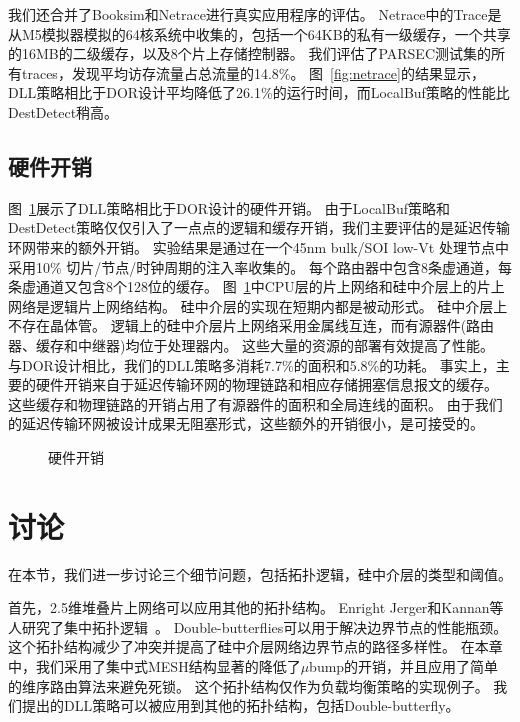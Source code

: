 我们还合并了Booksim和Netrace进行真实应用程序的评估。
Netrace中的Trace是从M5模拟器模拟的64核系统中收集的，包括一个64KB的私有一级缓存，一个共享的16MB的二级缓存，以及8个片上存储控制器。
我们评估了PARSEC测试集的所有traces，发现平均访存流量占总流量的14.8\%。
图~\ref{fig:netrace}的结果显示，DLL策略相比于DOR设计平均降低了26.1\%的运行时间，而LocalBuf策略的性能比DestDetect稍高。

\subsection{硬件开销}

图~\ref{fig:hardware}展示了DLL策略相比于DOR设计的硬件开销。
由于LocalBuf策略和DestDetect策略仅仅引入了一点点的逻辑和缓存开销，我们主要评估的是延迟传输环网带来的额外开销。
实验结果是通过在一个45nm bulk/SOI low-Vt 处理节点中采用10\% 切片/节点/时钟周期的注入率收集的。
每个路由器中包含8条虚通道，每条虚通道又包含8个128位的缓存。
图~\ref{fig:hardware}中CPU层的片上网络和硅中介层上的片上网络是逻辑片上网络结构。
硅中介层的实现在短期内都是被动形式。
硅中介层上不存在晶体管。
逻辑上的硅中介层片上网络采用金属线互连，而有源器件(路由器、缓存和中继器)均位于处理器内。
这些大量的资源的部署有效提高了性能。
与DOR设计相比，我们的DLL策略多消耗7.7\%的面积和5.8\%的功耗。
事实上，主要的硬件开销来自于延迟传输环网的物理链路和相应存储拥塞信息报文的缓存。
这些缓存和物理链路的开销占用了有源器件的面积和全局连线的面积。
由于我们的延迟传输环网被设计成果无阻塞形式，这些额外的开销很小，是可接受的。

\begin{figure}[htb]
\centering
{} 
\caption{硬件开销}
\label{fig:hardware}
\end{figure}


\section{讨论}
\label{sec:dlldiscussion}

在本节，我们进一步讨论三个细节问题，包括拓扑逻辑，硅中介层的类型和阈值。

首先，2.5维堆叠片上网络可以应用其他的拓扑结构。
Enright Jerger和Kannan等人研究了集中拓扑逻辑~。
Double-butterflies可以用于解决边界节点的性能瓶颈。
这个拓扑结构减少了冲突并提高了硅中介层网络边界节点的路径多样性。
在本章中，我们采用了集中式MESH结构显著的降低了$\mu$bump的开销，并且应用了简单的维序路由算法来避免死锁。
这个拓扑结构仅作为负载均衡策略的实现例子。
我们提出的DLL策略可以被应用到其他的拓扑结构，包括Double-butterfly。

